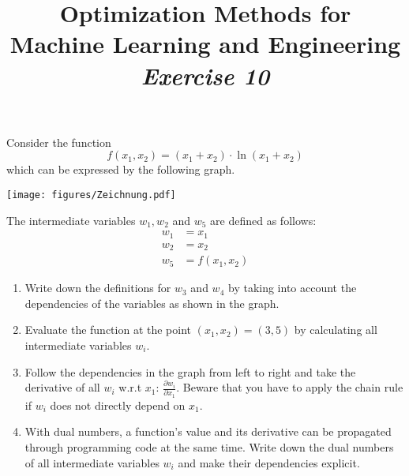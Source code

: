 



\author{}
\date{}
\title{Optimization Methods for \\Machine Learning and Engineering\\\vspace{0.5cm}\textit{Exercise 10}}
\maketitle


\setcounter{section}{10}
\setcounter{exercise}{0}


\begin{exercise}[subtitle={Paper}]

Consider the function 
\begin{equation}
f(x_1,x_2) = (x_1+x_2) \cdot \ln(x_1+x_2)
\end{equation}
which can be expressed by the following graph.

\begin{center}
\texttt{[image: figures/Zeichnung.pdf]}
\end{center}
The intermediate variables $w_1, w_2$ and $w_5$ are defined as follows:
\begin{align*}
w_1 &= x_1\\
w_2 &= x_2\\
w_5 &= f(x_1,x_2)
\end{align*}

\begin{enumerate}[label=\emph{\alph*)}]
\item Write down the definitions for $w_3$ and $w_4$ by taking into account the dependencies of the variables as shown in the graph.
\item Evaluate the function at the point $(x_1,x_2) = (3,5)$ by calculating all intermediate variables $w_i$.
\item Follow the dependencies in the graph from left to right and take the derivative of all $w_i$ w.r.t $x_1$: $\frac{\partial w_i}{\partial x_1}$. Beware that you have to apply the chain rule if $w_i$ does not directly depend on $x_1$.
\item With dual numbers, a function's value and its derivative can be propagated through programming code at the same time. Write down the dual numbers of all intermediate variables $w_i$ and make their dependencies explicit. 
\end{enumerate}
\end{exercise}


